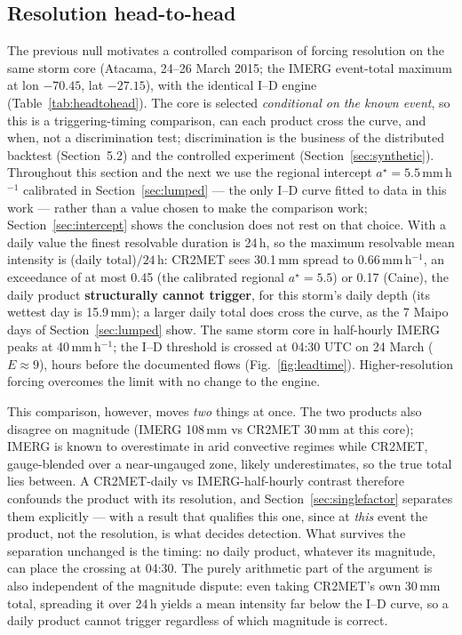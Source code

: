\documentclass[authoryear,preprint,review,12pt]{elsarticle}
\begin{document}
\subsection{Resolution head-to-head}
\label{sec:headtohead}

The previous null motivates a controlled comparison of forcing resolution on the
same storm core (Atacama, 24--26 March 2015; the IMERG event-total maximum at
lon $-70.45$, lat $-27.15$), with the identical I--D engine
(Table~\ref{tab:headtohead}). The core is selected \emph{conditional on the known
event}, so this is a triggering-timing comparison, can each product cross the curve,
and when, not a discrimination test; discrimination is the business of the
distributed backtest (Section~5.2) and the controlled experiment
(Section~\ref{sec:synthetic}). Throughout this section and the next we use the
regional intercept $a^\star=5.5$\,mm\,h$^{-1}$ calibrated in Section~\ref{sec:lumped}
--- the only I--D curve fitted to data in this work --- rather than a value chosen
to make the comparison work; Section~\ref{sec:intercept} shows the conclusion does
not rest on that choice. With a daily value the finest resolvable duration is
24\,h, so the maximum resolvable mean intensity is (daily total)$/24$\,h: CR2MET
sees 30.1\,mm spread to 0.66\,mm\,h$^{-1}$, an exceedance of at most 0.45
(the calibrated regional $a^\star=5.5$) or 0.17 (Caine), the daily product \textbf{structurally cannot
trigger}, for this storm's daily depth (its wettest day is 15.9\,mm); a larger daily total does cross the curve, as the 7 Maipo days of Section~\ref{sec:lumped} show. The same storm core in half-hourly IMERG peaks at
40\,mm\,h$^{-1}$; the I--D threshold is crossed at 04:30 UTC on 24 March
($E\approx9$), hours before the documented flows (Fig.~\ref{fig:leadtime}).
Higher-resolution forcing overcomes the limit with no change to the engine.

This comparison, however, moves \emph{two} things at once. The two products also
disagree on magnitude (IMERG 108\,mm vs CR2MET 30\,mm at this
core); IMERG is known to overestimate in arid convective regimes while CR2MET,
gauge-blended over a near-ungauged zone, likely underestimates, so the true
total lies between. A CR2MET-daily vs IMERG-half-hourly contrast therefore
confounds the product with its resolution, and Section~\ref{sec:singlefactor}
separates them explicitly --- with a result that qualifies this one, since at
\emph{this} event the product, not the resolution, is what decides detection.
What survives the separation unchanged is the timing: no daily product, whatever
its magnitude, can place the crossing at 04:30. The purely
arithmetic part of the argument is also independent of the magnitude dispute:
even taking CR2MET's own 30\,mm total, spreading it over 24\,h yields a
mean intensity far below the I--D curve, so a daily product cannot trigger
regardless of which magnitude is correct.
\end{document}
